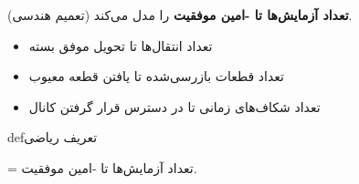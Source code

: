 \begin{Shaded}
\begin{Highlighting}[]
\NormalTok{(}\OperatorTok{,}\OperatorTok{,}\NormalTok{)}\OperatorTok{;}
\NormalTok{(}\OperatorTok{,} \OperatorTok{,} \OperatorTok{,} \OperatorTok{,} \NormalTok{)}\OperatorTok{;}
\NormalTok{(}\NormalTok{)}\OperatorTok{;} \NormalTok{(}\NormalTok{)}\OperatorTok{;}
\NormalTok{(}\NormalTok{)}\OperatorTok{;}
 \OperatorTok{;}

\NormalTok{(}\OperatorTok{,} \OperatorTok{/}\OperatorTok{,} \NormalTok{(}\NormalTok{))}\OperatorTok{;}
\end{Highlighting}
\end{Shaded}



\textbf{تعداد آزمایش‌ها تا -امین موفقیت} را مدل می‌کند (تعمیم هندسی).


\begin{itemize}
\tightlist
\item
  تعداد انتقال‌ها تا تحویل موفق  بسته
\item
  تعداد قطعات بازرسی‌شده تا یافتن  قطعه معیوب
\item
  تعداد شکاف‌های زمانی تا در دسترس قرار گرفتن  کانال
\end{itemize}

\begin{PSbox}[unbreakable]{def}{تعریف ریاضی}

 = تعداد آزمایش‌ها تا -امین موفقیت.

\end{PSbox}

